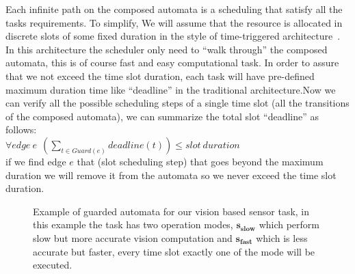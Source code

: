 \documentclass[11pt]{article}
\begin{document}
Each infinite path on the composed automata is a scheduling that satisfy all the tasks requirements. To simplify, We will assume that the resource is allocated in discrete slots of some fixed duration in the style of time-triggered architecture~\cite{RTComposer}. %
In this architecture the scheduler only need to ``walk through'' the composed automata, this is of course fast and easy computational task. 
In order to assure that we not exceed the time slot duration, each task will have pre-defined maximum duration time like ``deadline'' in the traditional architecture.Now we can verify all the possible scheduling steps of a single time slot (all the transitions of the composed automata), we can summarize the total slot ``deadline'' as follows:\\
$\forall edge~e ~~(\sum_{t \in Guard(e)} deadline(t) ) \leq slot~duration$ \\
if we find edge $e$ that (slot scheduling step) that goes beyond the maximum duration we will remove it from the automata so we never exceed the time slot duration.


\begin{figure}[]
    \centering
    
    
    \caption{Example of guarded automata for our vision based sensor task, in this example the task has two operation modes, $\mathbf{s_{slow}}$ which perform slow but more accurate vision computation and $\mathbf{s_{fast}}$ which is less accurate but faster, every time slot exactly one of the mode will be executed.
    \label{fig:sched_sense_auto}}
\end{figure}
\end{document}
